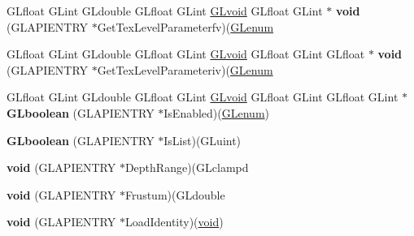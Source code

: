 \begin{DoxyCompactItemize}
\mbox{\label{struct_____g_ldispatch_table_rec_a0b5fcbb6aec213901e9da8dbc503000d}} 
G\+Lfloat G\+Lint G\+Ldouble G\+Lfloat G\+Lint \hyperlink{interfacevoid}{G\+Lvoid} G\+Lfloat G\+Lint $\ast$ {\bfseries void} (G\+L\+A\+P\+I\+E\+N\+T\+RY $\ast$Get\+Tex\+Level\+Parameterfv)(\hyperlink{interfacevoid}{G\+Lenum}
\item 
\mbox{\label{struct_____g_ldispatch_table_rec_a636465b9cdb2074ba48675929c553361}} 
G\+Lfloat G\+Lint G\+Ldouble G\+Lfloat G\+Lint \hyperlink{interfacevoid}{G\+Lvoid} G\+Lfloat G\+Lint G\+Lfloat $\ast$ {\bfseries void} (G\+L\+A\+P\+I\+E\+N\+T\+RY $\ast$Get\+Tex\+Level\+Parameteriv)(\hyperlink{interfacevoid}{G\+Lenum}
\item 
\mbox{\label{struct_____g_ldispatch_table_rec_ae37c6d3bf3766605f35616dccdda78c6}} 
G\+Lfloat G\+Lint G\+Ldouble G\+Lfloat G\+Lint \hyperlink{interfacevoid}{G\+Lvoid} G\+Lfloat G\+Lint G\+Lfloat G\+Lint $\ast$ {\bfseries G\+Lboolean} (G\+L\+A\+P\+I\+E\+N\+T\+RY $\ast$Is\+Enabled)(\hyperlink{interfacevoid}{G\+Lenum})
\item 
\mbox{\label{struct_____g_ldispatch_table_rec_a4efa790cb5fc944227b10aa747e1f1e5}} 
{\bfseries G\+Lboolean} (G\+L\+A\+P\+I\+E\+N\+T\+RY $\ast$Is\+List)(G\+Luint)
\item 
\mbox{\label{struct_____g_ldispatch_table_rec_a5e16630dd9d0424a49449b51c7a290fd}} 
{\bfseries void} (G\+L\+A\+P\+I\+E\+N\+T\+RY $\ast$Depth\+Range)(G\+Lclampd
\item 
\mbox{\label{struct_____g_ldispatch_table_rec_aa6d4321ec8196646227cece5128a0515}} 
{\bfseries void} (G\+L\+A\+P\+I\+E\+N\+T\+RY $\ast$Frustum)(G\+Ldouble
\item 
\mbox{\label{struct_____g_ldispatch_table_rec_a9f73256adb905479ac479873e061de71}} 
{\bfseries void} (G\+L\+A\+P\+I\+E\+N\+T\+RY $\ast$Load\+Identity)(\hyperlink{interfacevoid}{void})
\item 
\mbox{\label{struct_____g_ldispatch_table_rec_a0be6202242c33102ebbb788bb61f92bb}} 

\end{DoxyCompactItemize}
